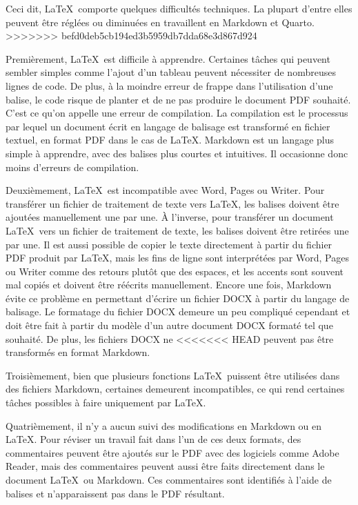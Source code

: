\documentclass[
  letterpaper,
]{scrbook}
\begin{document}
Ceci dit, \LaTeX~comporte quelques difficultés techniques. La plupart
d'entre elles peuvent être réglées ou diminuées en travaillent en
Markdown et Quarto.
>>>>>>> befd0deb5cb194ed3b5959db7dda68e3d867d924

Premièrement, \LaTeX~est difficile à apprendre. Certaines tâches qui
peuvent sembler simples comme l'ajout d'un tableau peuvent nécessiter de
nombreuses lignes de code. De plus, à la moindre erreur de frappe dans
l'utilisation d'une balise, le code risque de planter et de ne pas
produire le document PDF souhaité. C'est ce qu'on appelle une erreur de
compilation. La compilation est le processus par lequel un document
écrit en langage de balisage est transformé en fichier textuel, en
format PDF dans le cas de \LaTeX. Markdown est un langage plus simple à
apprendre, avec des balises plus courtes et intuitives. Il occasionne
donc moins d'erreurs de compilation.

Deuxièmement, \LaTeX~est incompatible avec Word, Pages ou Writer. Pour
transférer un fichier de traitement de texte vers \LaTeX, les balises
doivent être ajoutées manuellement une par une. À l'inverse, pour
transférer un document \LaTeX~vers un fichier de traitement de texte,
les balises doivent être retirées une par une. Il est aussi possible de
copier le texte directement à partir du fichier PDF produit par \LaTeX,
mais les fins de ligne sont interprétées par Word, Pages ou Writer comme
des retours plutôt que des espaces, et les accents sont souvent mal
copiés et doivent être réécrits manuellement. Encore une fois, Markdown
évite ce problème en permettant d'écrire un fichier DOCX à partir du
langage de balisage. Le formatage du fichier DOCX demeure un peu
compliqué cependant et doit être fait à partir du modèle d'un autre
document DOCX formaté tel que souhaité. De plus, les fichiers DOCX ne
<<<<<<< HEAD
peuvent pas être transformés en format Markdown.

Troisièmement, bien que plusieurs fonctions \LaTeX~puissent être
utilisées dans des fichiers Markdown, certaines demeurent incompatibles,
ce qui rend certaines tâches possibles à faire uniquement par \LaTeX.

Quatrièmement, il n'y a aucun suivi des modifications en Markdown ou en
\LaTeX. Pour réviser un travail fait dans l'un de ces deux formats, des
commentaires peuvent être ajoutés sur le PDF avec des logiciels comme
Adobe Reader, mais des commentaires peuvent aussi être faits directement
dans le document \LaTeX~ou Markdown. Ces commentaires sont identifiés à
l'aide de balises et n'apparaissent pas dans le PDF résultant.
\end{document}
